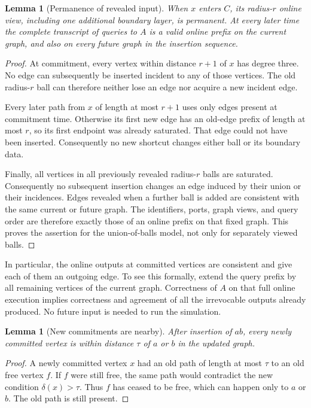 \documentclass[11pt]{article}
\newtheorem{lemma}[theorem]{Lemma}
\theoremstyle{definition}
\begin{document}
\begin{lemma}[Permanence of revealed input]\label{lem:permanence}
When $x$ enters $C$, its radius-$r$ online view, including one additional
boundary layer, is permanent. At every later time the complete transcript
of queries to $A$ is a valid online prefix on the current graph, and also
on every future graph in the insertion sequence.
\end{lemma}
\begin{proof}
At commitment, every vertex within distance $r+1$ of $x$ has degree three.
No edge can subsequently be inserted incident to any of those vertices.
The old radius-$r$ ball can therefore neither lose an edge nor acquire a
new incident edge.

Every later path from $x$ of length at most $r+1$ uses only edges present at
commitment time. Otherwise its first new edge has an old-edge prefix of
length at most $r$, so its first endpoint was already saturated. That edge
could not have been inserted. Consequently no new shortcut changes either
ball or its boundary data.

Finally, all vertices in all previously revealed radius-$r$ balls are
saturated. Consequently no subsequent insertion changes an edge induced
by their union or their incidences. Edges revealed when a further ball is
added are consistent with the same current or future graph. The identifiers,
ports, graph views, and query order are therefore exactly those of an online
prefix on that fixed graph. This proves the assertion for the union-of-balls
model, not only for separately viewed balls.
\end{proof}

In particular, the online outputs at committed vertices are consistent and
give each of them an outgoing edge. To see this formally, extend the query
prefix by all remaining vertices of the current graph. Correctness of $A$
on that full online execution implies correctness and agreement of all the
irrevocable outputs already produced. No future input is needed to run the
simulation.

\begin{lemma}[New commitments are nearby]\label{lem:nearby}
After insertion of $ab$, every newly committed vertex is within distance
$\tau$ of $a$ or $b$ in the updated graph.
\end{lemma}
\begin{proof}
A newly committed vertex $x$ had an old path of length at most $\tau$ to an
old free vertex $f$. If $f$ were still free, the same path would contradict
the new condition $\delta(x)>\tau$. Thus $f$ has ceased to be free, which
can happen only to $a$ or $b$. The old path is still present.
\end{proof}
\end{document}
